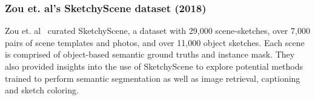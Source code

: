 \subsubsection{Zou et. al's SketchyScene dataset (2018)}
Zou et. al~\cite{zou_eccv18} curated SketchyScene, a dataset with 29,000 scene-sketches, over 7,000 pairs of scene templates and photos, and  over 11,000 object sketches. Each scene is comprised of object-based semantic ground truths and instance mask. They also provided insights into the use of SketchyScene to explore potential methods trained to perform semantic segmentation as well as image retrieval, captioning and sketch coloring.




\begin{figure}[t]
\centering
{}
\end{figure}
